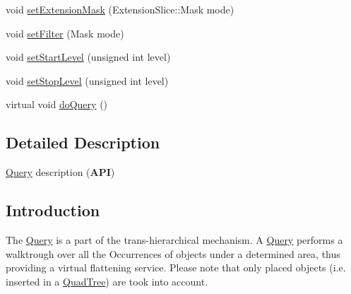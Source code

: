 \begin{DoxyCompactItemize}
void \hyperlink{classHurricane_1_1Query_af7f83fd3aefe1b5654f9bdd3566fe0d4}{set\-Extension\-Mask} (Extension\-Slice\-::\-Mask mode)
\item 
void \hyperlink{classHurricane_1_1Query_a457a0cda5ea5ad849a46aefce2514963}{set\-Filter} (Mask mode)
\item 
void \hyperlink{classHurricane_1_1Query_a8c4bc1bcfae942042ccb90a46b6fb510}{set\-Start\-Level} (unsigned int level)
\item 
void \hyperlink{classHurricane_1_1Query_a70359c71d7dc7e3f17d0a29c8208c92f}{set\-Stop\-Level} (unsigned int level)
\item 
virtual void \hyperlink{classHurricane_1_1Query_a2ca5bf71c7b35e14c4a64488a5e21bc6}{do\-Query} ()
\end{DoxyCompactItemize}


\subsection{Detailed Description}
\hyperlink{classHurricane_1_1Query}{Query} description ({\bfseries A\-P\-I}) 

\hypertarget{classHurricane_1_1Query_secQueryIntro}{}\subsection{Introduction}\label{classHurricane_1_1Query_secQueryIntro}
The \hyperlink{classHurricane_1_1Query}{Query} is a part of the trans-\/hierarchical mechanism. A \hyperlink{classHurricane_1_1Query}{Query} performs a walktrough over all the Occurrences of objects under a determined area, thus providing a virtual flattening service. Please note that only placed objects (i.\-e. inserted in a \hyperlink{classHurricane_1_1QuadTree}{Quad\-Tree}) are took into account.

